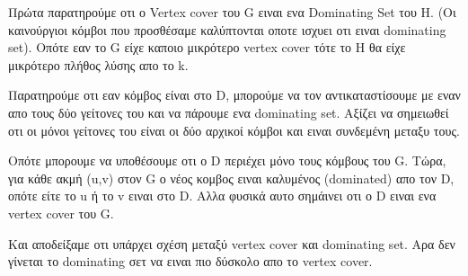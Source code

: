 \documentclass[12pt]{article}
\begin{document}
Πρώτα παρατηρούμε οτι ο Vertex cover του G ειναι ενα Dominating Set του H.
(Οι καινούργιοι κόμβοι που προσθέσαμε καλύπτονται οποτε ισχυει οτι ειναι dominating set).
Οπότε εαν το G είχε καποιο μικρότερο vertex cover τότε το H θα είχε μικρότερο πλήθος λύσης απο το k.

Παρατηρούμε οτι εαν κόμβος είναι στο D, μπορούμε να τον αντικαταστίσουμε με εναν απο τους δύο γείτονες του και να πάρουμε ενα dominating set. Αξίζει να σημειωθεί οτι οι μόνοι γείτονες του είναι οι δύο αρχικοί κόμβοι και ειναι συνδεμένη μεταξυ τους.

Οπότε μπορουμε να υποθέσουμε οτι ο D περιέχει μόνο τους κόμβους του G. Τώρα, για κάθε ακμή (u,v) στον G ο νέος κομβος ειναι καλυμένος (dominated) απο τον D, οπότε είτε το u ή το v ειναι στο D. Αλλα φυσικά αυτο σημάινει οτι ο D ειναι ενα vertex cover του G.

Kαι αποδείξαμε οτι υπάρχει σχέση μεταξύ vertex cover και dominating set. Αρα δεν γίνεται το dominating σετ να ειναι πιο δύσκολο απο το vertex cover.


 
\end{document}
